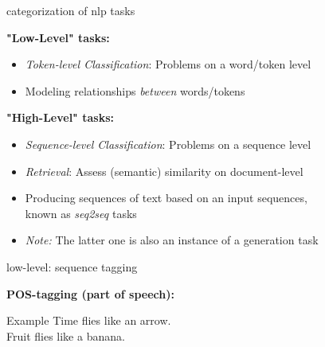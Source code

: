 \begin{vbframe}{categorization of nlp tasks}

\vfill

\textbf{"Low-Level" tasks:}

	\begin{itemize}
		\item \textit{Token-level Classification}: Problems on a word/token level
		\item Modeling relationships \textit{between} words/tokens %
	\end{itemize}
	
\vspace{.3cm}

\textbf{"High-Level" tasks:}

	\begin{itemize}
		\item \textit{Sequence-level Classification}: Problems on a sequence level
		\item \textit{Retrieval}: Assess (semantic) similarity on document-level
		\item Producing sequences of text based on an input sequences,\\known as \textit{seq2seq} tasks
		\item \textit{Note:} The latter one is also an instance of a generation task
	\end{itemize}

\vfill

\end{vbframe}


\begin{frame}{low-level: sequence tagging}

\vspace{1cm}

\textbf{POS-tagging (part of speech):}

\begin{exampleblock}{Example}
	Time flies   like   an   arrow.\\Fruit   flies   like   a   banana.
\end{exampleblock}

\vfill

\end{frame}

